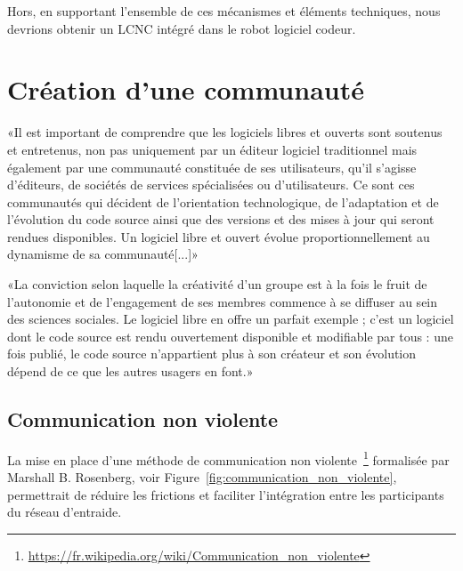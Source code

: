 Hors, en supportant l'ensemble de ces mécanismes et éléments techniques, nous devrions obtenir un LCNC intégré dans le robot logiciel codeur.



\section{Création d’une communauté}


«Il est important de comprendre que les logiciels libres et ouverts sont soutenus et entretenus, non pas uniquement par un éditeur logiciel traditionnel mais également par une communauté constituée de ses utilisateurs, qu'il s'agisse d'éditeurs, de sociétés de services spécialisées ou d'utilisateurs. Ce sont ces communautés qui décident de l'orientation technologique, de l'adaptation et de l'évolution du code source ainsi que des versions et des mises à jour qui seront rendues disponibles. Un logiciel libre et ouvert évolue proportionnellement au dynamisme de sa communauté[...]»~\cite{tresor_gouv_logiciels_libres}

«La conviction selon laquelle la créativité d’un groupe est à la fois le fruit de l’autonomie et de l’engagement de ses membres commence à se diffuser au sein des sciences sociales. Le logiciel libre en offre un parfait exemple ; c’est un logiciel dont le code source est rendu ouvertement disponible et modifiable par tous : une fois publié, le code source n’appartient plus à son créateur et son évolution dépend de ce que les autres usagers en font.»~\cite{REDP_173_0387}

\subsection{Communication non violente}

La mise en place d’une méthode de communication non violente~\footnote{\url{https://fr.wikipedia.org/wiki/Communication_non_violente}} formalisée par Marshall B. Rosenberg, voir Figure~\ref{fig:communication_non_violente}, permettrait de réduire les frictions et faciliter l'intégration entre les participants du réseau d’entraide.

